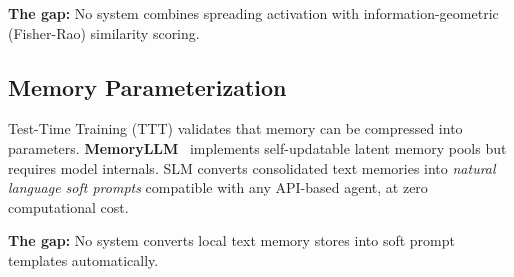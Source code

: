 \textbf{The gap:} No system combines spreading activation with information-geometric (Fisher-Rao) similarity scoring.

\subsection{Memory Parameterization}

Test-Time Training (TTT) validates that memory can be compressed into parameters. \textbf{MemoryLLM}~\cite{memoryllm} implements self-updatable latent memory pools but requires model internals. SLM converts consolidated text memories into \emph{natural language soft prompts} compatible with any API-based agent, at zero computational cost.

\textbf{The gap:} No system converts local text memory stores into soft prompt templates automatically.

